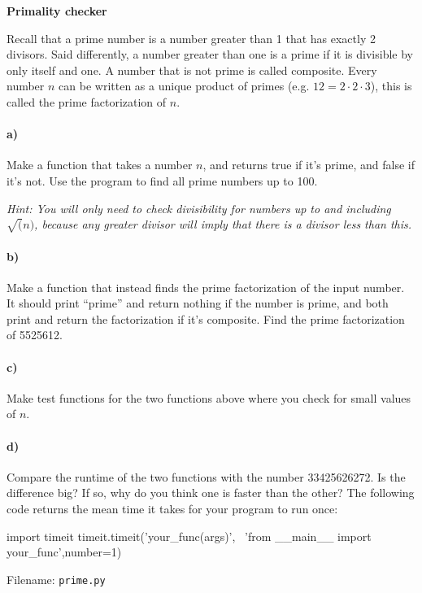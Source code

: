 \begin{Problem}{\textbf{Primality checker}} \label{prime}

\noindent Recall that a prime number is a number greater than 1 that has exactly 2 divisors.
Said differently, a number greater than one is a prime if it is divisible by only
itself and one. A number that is not prime is called composite. Every number $n$
can be written as a unique product of primes (e.g. $12 = 2\cdot2\cdot 3 $),
this is called the prime factorization of $n$.

\paragraph{a)}
Make a function that takes a number $n$, and returns true if it's prime, and false
if it's not. Use the program to find all prime numbers up to 100.

\emph{Hint: You will only need to check divisibility for numbers up to and
including $\sqrt(n)$, because any greater divisor will imply that there
is a divisor less than this.}

\paragraph{b)}
Make a function that instead finds the prime factorization of the input
number. It should print ``prime'' and return nothing if the number is prime, and both
print and return the factorization if it's composite. Find the prime factorization
of 5525612.

\paragraph{c)}
Make test functions for the two functions above where you check for small values
of $n$.

\paragraph{d)}
Compare the runtime of the two functions with the number 33425626272.
Is the difference big? If so, why do you think one is faster than the other?
The following code returns the mean time it takes for your program to run once:
\begin{python}
import timeit
timeit.timeit('your_func(args)', \
    'from __main__ import your_func',number=1)
\end{python}

Filename: \texttt{prime.py}
\end{Problem}

